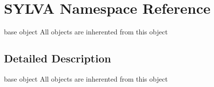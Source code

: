 \hypertarget{namespace_s_y_l_v_a}{}\section{S\+Y\+L\+VA Namespace Reference}
\label{namespace_s_y_l_v_a}


base object All objects are inherented from this object  




\subsection{Detailed Description}
base object All objects are inherented from this object 